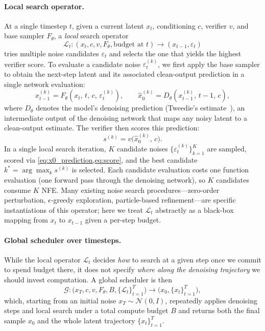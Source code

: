 \paragraph{Local search operator.}
At a single timestep $t$, given a current latent $x_t$, conditioning $c$,
verifier $v$, and base sampler $F_\theta$, a \emph{local} search operator
\[
  \mathcal{L}_t : (x_t, c, v, F_\theta, \text{budget at } t)
  \longrightarrow (x_{t-1}, \varepsilon_t)
\]
tries multiple noise candidates $\varepsilon_t$ and selects the one that
yields the highest verifier score.
To evaluate a candidate noise $\varepsilon_t^{(k)}$, we first apply the
base sampler to obtain the next-step latent and its associated clean-output
prediction in a single network evaluation:
\begin{equation}
  x_{t-1}^{(k)} = F_\theta(x_t,\, t,\, c,\, \varepsilon_t^{(k)}),
  \qquad
  \hat{x}_0^{(k)} = D_\theta(x_{t-1}^{(k)},\, t\!-\!1,\, c),
  \label{eq:x0_prediction}
\end{equation}
where $D_\theta$ denotes the model's denoising prediction (Tweedie's
estimate~\citep{song2021scorebased}), an intermediate output of the
denoising network that maps any noisy latent to a clean-output estimate.
The verifier then scores this prediction:
\begin{equation}
  s^{(k)} = v\!\bigl(\hat{x}_0^{(k)},\, c\bigr).
  \label{eq:score}
\end{equation}
In a single local search iteration, $K$ candidate noises
$\{\varepsilon_t^{(k)}\}_{k=1}^K$ are sampled, scored via
\cref{eq:x0_prediction,eq:score}, and the best candidate
$k^* = \arg\max_k s^{(k)}$ is selected.
Each candidate evaluation costs one function evaluation (one forward pass
through the denoising network), so $K$ candidates consume $K$ NFE.
Many existing noise search procedures---zero-order perturbation,
$\epsilon$-greedy exploration, particle-based
refinement---are specific instantiations of this operator; here we treat
$\mathcal{L}_t$ abstractly as a black-box mapping from $x_t$ to $x_{t-1}$
given a per-step budget.

\paragraph{Global scheduler over timesteps.}
While the local operator $\mathcal{L}_t$ decides \emph{how} to search at a given
step once we commit to spend budget there, it does not specify \emph{where
along the denoising trajectory} we should invest computation.
A global scheduler is then
\[
  \mathcal{G} :
  \bigl(x_T, c, v, F_\theta, B, \{\mathcal{L}_t\}_{t=1}^T\bigr)
  \longrightarrow \bigl(x_0, \{x_t\}_{t=1}^T\bigr),
\]
which, starting from an initial noise $x_T \sim \mathcal{N}(0, I)$, repeatedly
applies denoising steps and local search under a total compute budget $B$ and
returns both the final sample $x_0$ and the whole latent trajectory
$\{x_t\}_{t=1}^T$.


